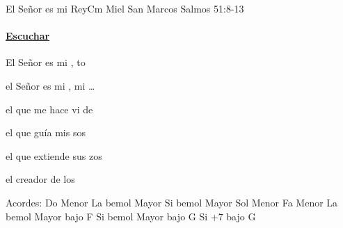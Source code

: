 \documentclass[12pt, spanish]{book}
\begin{document}
    \begin{song}{El Señor es mi Rey}{Cm}
    {} %
    {Miel San Marcos}
    {Salmos 51:8-13} %
    {}
        \ifChordBk
        \paragraph{\mbox{}\hfill\protect\href{https://open.spotify.com/intl-es/track/7Azhuk7zD1duTn4VzjzbNO}{Escuchar}\mbox{}\hfill}
        \fi


        \begin{SBOpGroup}
            El Señor es mi ,  to

            el Señor es mi , mi \ldots

            el que me hace vi de 

            el que guía mis sos

            el que extiende sus zos

            el creador de los 
        \end{SBOpGroup}


        \ifChordBk
        \begin{SBOpGroup}
            Acordes:\break
            \upchord{\Cm}\qquad Do Menor \hfill
            \upchord{\Aflat}\qquad La bemol Mayor \hfill\null\break
            \upchord{\Bflat}\qquad Si bemol Mayor \hfill
            \upchord{\Gm}\qquad Sol Menor \hfill\null\break
            \upchord{\Fm}\qquad Fa Menor \hfill
            \upchord{\AflatF}\qquad La bemol Mayor bajo F \hfill\null\break
            \upchord{\BflatG}\qquad Si bemol Mayor bajo G \hfill\null\break
            \upchord{\BmajsevenG}\qquad Si +7 bajo G \hfill\null\break
        \end{SBOpGroup}
        \fi

        \begin{SBExtraKeys}{


}
\end{SBExtraKeys}
\end{song}
\end{document}
